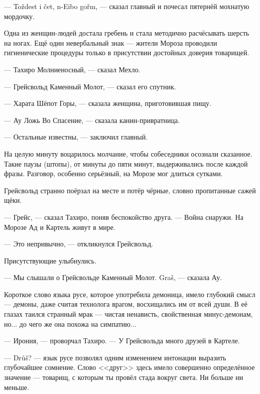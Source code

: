 --- To\v{z}dest i \v{c}et, n-Eibo go\v{r}m\FM, --- сказал главный и почесал пятернёй мохнатую мордочку.

Одна из женщин-людей достала гребень и стала методично расчёсывать шерсть на ногах.
Ещё один невербальный знак --- жители Мороза проводили гигиенические процедуры только в присутствии достойных доверия товарищей.

--- Тахиро Молниеносный, --- сказал Мехло.

--- Грейсвольд Каменный Молот, --- сказал его спутник.

--- Харата Шёпот Горы, --- сказала женщина, приготовившая пищу.

--- Ау Ложь Во Спасение, --- сказала канин-привратница.

--- Остальные известны, --- заключил главный.

На целую минуту воцарилось молчание, чтобы собеседники осознали сказанное.
Такие паузы (штопы), от минуты до пяти минут, выдерживались после каждой фразы.
Разговор, особенно серьёзный, на Морозе мог длиться сутками\FM.

Грейсвольд странно поёрзал на месте и потёр чёрные, словно пропитанные сажей щёки.

--- Грейс, --- сказал Тахиро, поняв беспокойство друга.
--- Война снаружи.
На Морозе Ад и Картель живут в мире.

--- Это непривычно, --- откликнулся Грейсвольд.

Присутствующие улыбнулись.

--- Мы слышали о Грейсвольде Каменный Молот.
Gra\v{s}\FM, --- сказала Ау.

Короткое слово языка русе, которое употребила демоница, имело глубокий смысл --- демоны, даже считая технолога врагом, восхищались им от всей души.
В её глазах таился странный мрак --- чистая ненависть, свойственная минус-демонам, но... до чего же она похожа на симпатию...

--- Ирония, --- проворчал Тахиро.
--- У Грейсвольда много друзей в Картеле.

--- Dr\r{u}\v{s}? --- язык русе позволял одним изменением интонации выразить глубочайшее сомнение.
Слово <<друг>> здесь имело совершенно определённое значение --- товарищ, с которым ты провёл стада вокруг света.
Ни больше ни меньше.

